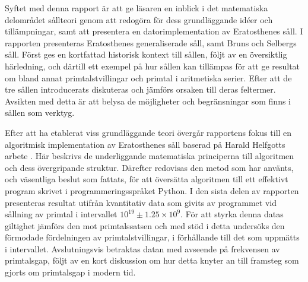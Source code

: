Syftet med denna rapport är att ge läsaren en inblick i det matematiska delområdet sållteori genom att redogöra för dess grundläggande idéer och tillämpningar,
samt att presentera en datorimplementation av Eratosthenes såll.
%
I rapporten presenteras
Eratosthenes generaliserade såll,
samt Bruns och Selbergs såll.
Först ges en kortfattad historisk kontext till sållen,
följt av en översiktlig härledning,
och därtill ett exempel på hur sållen kan tillämpas
för att ge resultat om bland annat primtalstvillingar och primtal i aritmetiska serier.
%
Efter att de tre sållen introducerats diskuteras och jämförs orsaken till deras feltermer.
Avsikten med detta är att belysa de möjligheter och begränsningar som finns i sållen som verktyg.
%

%
Efter att ha etablerat viss grundläggande teori
övergår rapportens fokus till en algoritmisk implementation av Eratosthenes såll baserad på Harald Helfgotts arbete \cite{HaraldSieve}.
%
Här beskrivs de underliggande matematiska principerna till algoritmen och dess övergripande struktur. 
Därefter redovisas den metod som har använts, och väsentliga beslut som fattats,
för att översätta algoritmen till ett effektivt program skrivet i programmeringsspråket Python.
%
I den sista delen av rapporten presenteras resultat utifrån kvantitativ data som givits av programmet vid sållning av primtal i intervallet \(10^{19}\pm 1.25\times10^9\).
För att styrka denna datas giltighet jämförs den mot primtalssatsen och med stöd i detta undersöks den förmodade fördelningen av primtalstvillingar, i förhållande till det som uppmätts i intervallet.
Avslutningsvis betraktas datan med avseende på frekvensen av primtalsgap, följt av en kort diskussion om hur detta knyter an till framsteg som gjorts om primtalsgap i modern tid.


